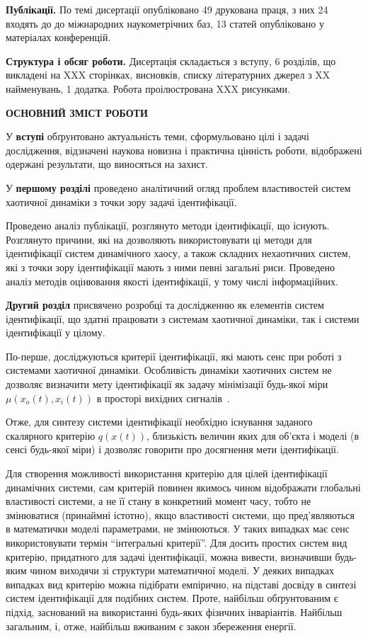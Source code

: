 \documentclass[a4paper,13pt]{atuaref}
\newcommand{\xsect}[1]{\medskip\begin{center}\textbf{#1}\end{center}\medskip\penalty10000}
\begin{document}
\smallskip
\textbf{Публікації.}
По темі дисертації опубліковано
49 друкована праця,
з них
24 входять до до міжнародних наукометрічних баз,
13 статей опубліковано у матеріалах конференцій.

\smallskip
\textbf{Структура і обсяг роботи.}
Дисертація складається з вступу, 6 розділів, що викладені на
XXX сторінках, висновків, списку літературних джерел з
XX найменувань,
1 додатка.
Робота проілюстрована XXX рисунками.


\xsect{ОСНОВНИЙ ЗМІСТ РОБОТИ}

У \textbf{вступі} обґрунтовано актуальність теми,
сформульовано цілі і задачі дослідження,
відзначені наукова новизна і практична цінність роботи, відображені
одержані результати, що виносяться на захист.

У \textbf{першому розділі}
проведено аналітичний огляд проблем
властивостей систем хаотичної динаміки
з точки зору задачі ідентифікації.

Проведено аналіз публікації, розглянуто методи ідентифікації, що існують.
Розглянуто причини, які на дозволяють використовувати ці методи для
ідентифікації систем динамічного хаосу, а також складних нехаотичних систем, які
з точки зору ідентифікації мають з ними певні загальні риси.  Проведено аналіз
методів оцінювання якості ідентифікації, у тому числі інформаційних.



\textbf{Другий розділ}
присвячено розробці та дослідженню як елементів систем ідентифікації,
що здатні працювати з системам хаотичної динаміки, так і системи ідентифікації у цілому.

По-перше, досліджуються критерії ідентифікації,
які мають сенс при роботі з системами
хаотичної динаміки.
Особливість динаміки хаотичних систем не дозволяє визначити мету ідентифікації
як задачу мінімізації будь-якої міри
$ \mu (x_o (t), x_i (t)) $ в просторі
вихідних сигналів~\cite{atu_asau11, atu_asau12, atu_asau14}.

Отже, для синтезу системи ідентифікації необхідно існування заданого скалярного
критерію $q(x(t)) $, близькість величин яких для об'єкта і моделі (в сенсі
будь-якої міри) і дозволяє говорити про досягнення мети ідентифікації.

Для створення можливості використання критерію для цілей ідентифікації
динамічних системи, сам критерій повинен якимось чином відображати глобальні
властивості системи, а не її стану в конкретний момент часу, тобто не
змінюватися (принаймні істотно), якщо властивості системи, що пред'являються в
математички моделі параметрами, не змінюються. У таких випадках має сенс
використовувати термін ``інтегральні критерії''.
Для досить простих систем вид критерію, придатного для задачі ідентифікації,
можна вивести, визначивши будь-яким чином виходячи зі структури математичної
моделі. У деяких випадках випадках вид критерію можна підібрати емпірично, на
підставі досвіду в синтезі систем ідентифікації для подібних систем. Проте,
найбільш обґрунтованим є підхід, заснований на використанні будь-яких фізичних
інваріантів.
Найбільш загальним, і, отже, найбільш вживаним є закон збереження енергії.
\end{document}
